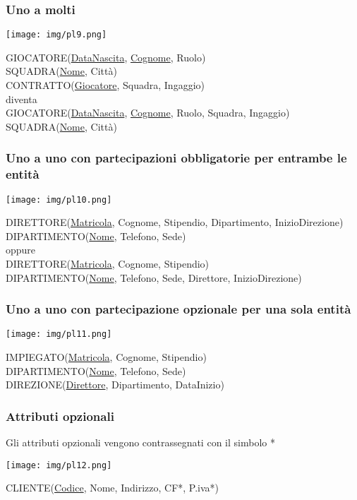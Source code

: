 \documentclass[a4paper]{article}
\begin{document}
\subsubsection{Uno a molti}
\begin{center}
      \texttt{[image: img/pl9.png]}
\end{center}
%
GIOCATORE(\underline{DataNascita}, \underline{Cognome}, Ruolo)\\
SQUADRA(\underline{Nome}, Città)\\
CONTRATTO(\underline{Giocatore}, Squadra, Ingaggio)\medskip\\
%
diventa\medskip\\
%
GIOCATORE(\underline{DataNascita}, \underline{Cognome}, Ruolo, Squadra, Ingaggio)\\
SQUADRA(\underline{Nome}, Città)

\subsubsection{Uno a uno con partecipazioni obbligatorie per entrambe le entità}
\begin{center}
      \texttt{[image: img/pl10.png]}
\end{center}
%
DIRETTORE(\underline{Matricola}, Cognome, Stipendio, Dipartimento, InizioDirezione)\\
DIPARTIMENTO(\underline{Nome}, Telefono, Sede)\medskip\\
%
oppure\medskip\\
%
DIRETTORE(\underline{Matricola}, Cognome, Stipendio)\\
DIPARTIMENTO(\underline{Nome}, Telefono, Sede, Direttore, InizioDirezione)

\subsubsection{Uno a uno con partecipazione opzionale per una sola entità}
\begin{center}
      \texttt{[image: img/pl11.png]}
\end{center}
%
IMPIEGATO(\underline{Matricola}, Cognome, Stipendio)\\
DIPARTIMENTO(\underline{Nome}, Telefono, Sede)\\
DIREZIONE(\underline{Direttore}, Dipartimento, DataInizio)

\subsubsection{Attributi opzionali}
Gli attributi opzionali vengono contrassegnati con il simbolo *
\begin{center}
      \texttt{[image: img/pl12.png]}
\end{center}
%
CLIENTE(\underline{Codice}, Nome, Indirizzo, CF*, P.iva*)
\end{document}
